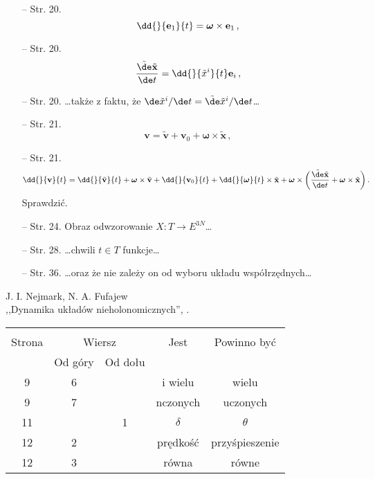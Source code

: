 \documentclass[a4paper,11pt]{article}
\begin{document}
\begin{itemize}
\item[--] Str. 20.
  $$\dd{}{ \mathbf{ e }_{ 1 } }{ t } = \boldsymbol{ \omega } \times
  \bold{ e }_{ 1 } \, ,$$
\item[--] Str. 20.
  $$\frac{ \tilde{ \de } \tilde{ \mathbf{ x } } }{ \de t } = \dd{}{
    \tilde{ x }^{ i }}{ t } \mathbf{ e }_{ i } \, ,$$
\item[--] Str. 20. \ldots także z faktu, że
  $\de \tilde{ x }^{ i } / \de t = \tilde{ \de } \tilde{ x }^{ i } /
  \de t$\ldots
\item[--] Str. 21.
  $$\mathbf{ v } = \tilde{ \mathbf{ v } } + \mathbf{ v }_{ 0 } +
  \boldsymbol{ \omega } \times \tilde{ \mathbf{ x } } \, ,$$
\item[--] Str. 21.
  $$\dd{}{ \mathbf{ v } }{ t } = \dd{}{ \tilde{ \mathbf{ v } } }{ t }
  + \boldsymbol{ \omega } \times \tilde{ \mathbf{ v } } + \dd{}{
    \mathbf{ v }_{ 0 } }{ t } + \dd{}{ \boldsymbol{ \omega } }{ t }
  \times \tilde{ \bold{ x } } + \boldsymbol{ \omega } \times \bigg(
  \frac{ \tilde{ \de } \tilde{ \bold{ x } } }{ \de t } + \boldsymbol{
    \omega } \times \tilde{ \bold{ x } } \bigg) \, .$$ Sprawdzić.
\item[--] Str. 24. Obraz odwzorowanie
  $X : T \rightarrow E^{ 3N }$\ldots
\item[--] Str. 28. \ldots chwili $t \in T$ funkcje\ldots
\item[--] Str. 36. \ldots oraz że nie zależy on od wyboru układu
  współrzędnych\ldots
\end{itemize}

\vspace{\spaceTwo}





\begin{center}
  J. I. Nejmark, N. A. Fufajew \\
  ,,Dynamika układów nieholonomicznych'', \cite{JNNFDUN}.
\end{center}


\begin{center}
  \begin{tabular}{|c|c|c|c|c|}
    \hline
    & \multicolumn{2}{c|}{} & & \\
    Strona & \multicolumn{2}{c|}{Wiersz}
                            & Jest & Powinno być \\ \cline{2-3}
    & Od góry & Od dołu & & \\
    \hline
    9   &  6 & & i wielu & wielu \\
    9   &  7 & & nczonych & uczonych \\
    11  & &  1 & $\delta$ & $\theta$ \\
    12  &  2 & & prędkość & przyśpieszenie \\
    12  &  3 & & równa & równe \\
    \hline
  \end{tabular}
\end{center}
\end{document}
